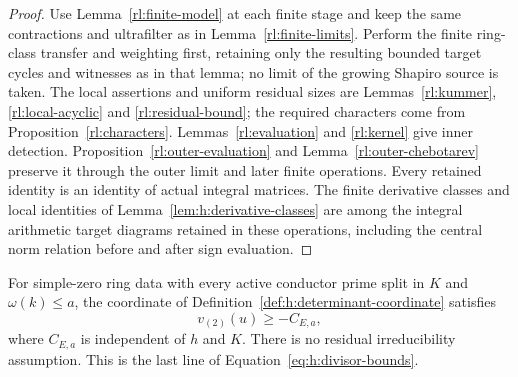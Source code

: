 \begin{proof}
Use Lemma~\ref{rl:finite-model} at each finite stage and keep the
same contractions and ultrafilter as in Lemma~\ref{rl:finite-limits}.
Perform the finite ring-class transfer and weighting first, retaining
only the resulting bounded target cycles and witnesses as in that
lemma; no limit of the growing Shapiro source is taken.
The local assertions and uniform residual sizes are
Lemmas~\ref{rl:kummer}, \ref{rl:local-acyclic} and
\ref{rl:residual-bound}; the required characters come from
Proposition~\ref{rl:characters}. Lemmas~\ref{rl:evaluation} and
\ref{rl:kernel} give inner detection. Proposition~\ref{rl:outer-evaluation}
and Lemma~\ref{rl:outer-chebotarev} preserve it through the
outer limit and later finite operations. Every retained identity is
an identity of actual integral matrices. The finite derivative classes and local identities of
Lemma~\ref{lem:h:derivative-classes} are among the integral arithmetic
target diagrams retained in these operations, including the central
norm relation before and after sign evaluation.
\end{proof}

\begin{lemma}
\label{lem:h:uniform-ring-determinant}
For simple-zero ring data with every active conductor prime split in
$K$ and $\omega(k)\le a$, the coordinate of
Definition~\ref{def:h:determinant-coordinate} satisfies
\[
 v_{(2)}(u)\ge -C_{E,a},
\]
where $C_{E,a}$ is independent of $h$ and $K$.
There is no residual irreducibility assumption. This is the last
line of Equation~\eqref{eq:h:divisor-bounds}.
\end{lemma}

